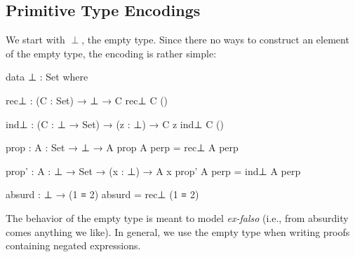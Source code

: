 \documentclass[12pt]{article}
\begin{document}
\subsection*{Primitive Type Encodings}
We start with \(\perp\), the empty type. Since there no ways to construct
an element of the empty type, the encoding is rather simple:
\begin{center}
\begin{minipage}{0.9\textwidth}
\begin{code}
data ⊥ : Set where

rec⊥ : (C : Set) → ⊥ → C
rec⊥ C ()

ind⊥ : (C : ⊥ → Set) → (z : ⊥) → C z
ind⊥ C ()

prop : {A : Set} → ⊥ → A
prop {A} perp = rec⊥ A perp

prop' : {A : ⊥ → Set} → (x : ⊥) → A x
prop' {A} perp = ind⊥ A perp

absurd : ⊥ → (1 ≡ 2)
absurd = rec⊥ (1 ≡ 2) 
\end{code}
\end{minipage}
\end{center}
The behavior of the empty type is meant to model {\it ex-falso} (i.e., from
absurdity comes anything we like). In general, we use the empty type when
writing proofs containing negated expressions.
\end{document}
